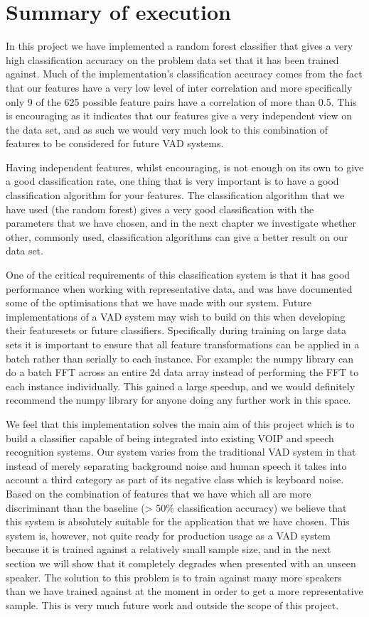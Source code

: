 \documentclass[ %
                    author={Sam Phippen},
                supervisor={Dr. Rafal Bogacz},
                     title={Real time voice activity detectors in noisy personal computing environments},
                  subtitle={},
                    degree={MEng},
                      year={2012} ]{thesis}
\begin{document}
\section{Summary of execution}

In this project we have implemented a random forest classifier that gives a
very high classification accuracy on the problem data set that it has been
trained against. Much of the implementation's classification accuracy comes
from the fact that our features have a very low level of inter correlation and
more specifically only 9 of the 625 possible feature pairs have a correlation
of more than 0.5. This is encouraging as it indicates that our features give
a very independent view on the data set, and as such we would very much look
to this combination of features to be considered for future VAD systems.

Having independent features, whilst encouraging, is not enough on its own to
give a good classification rate, one thing that is very important is to have a
good classification algorithm for your features. The classification algorithm
that we have used (the random forest) gives a very good classification with the
parameters that we have chosen, and in the next chapter we investigate whether
other, commonly used, classification algorithms can give a better result on our
data set.

One of the critical requirements of this classification system is that it has
good performance when working with representative data, and was have documented
some of the optimisations that we have made with our system. Future
implementations of a VAD system may wish to build on this when developing their
featuresets or future classifiers. Specifically during training on large data
sets it is important to ensure that all feature transformations can be applied
in a batch rather than serially to each instance. For example: the numpy
library can do a batch FFT across an entire 2d data array instead of performing
the FFT to each instance individually. This gained a large speedup, and we
would definitely recommend the numpy library for anyone doing any further work
in this space.

We feel that this implementation solves the main aim of this project which is
to build a classifier capable of being integrated into existing VOIP and speech
recognition systems. Our system varies from the traditional VAD system in that
instead of merely separating background noise and human speech it takes into
account a third category as part of its negative class which is keyboard noise.
Based on the combination of features that we have which all are more
discriminant than the baseline (> 50\% classification accuracy) we believe that
this system is absolutely suitable for the application that we have chosen.
This system is, however, not quite ready for production usage as a VAD system
because it is trained against a relatively small sample size, and in the next
section we will show that it completely degrades when presented with an unseen
speaker. The solution to this problem is to train against many more speakers
than we have trained against at the moment in order to get a more
representative sample. This is very much future work and outside the scope of
this project.
\end{document}
